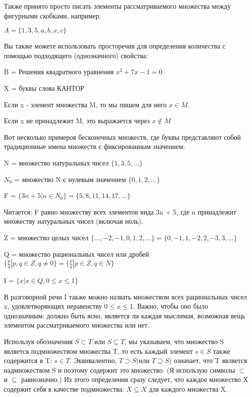 Также принято просто писать элементы рассматриваемого множества между фигурными скобками, например:

\vspace{0.5cm}
\(A = \{1,3,5,a,b,x,c\}\)
\vspace{0.5cm}

Вы также можете использовать просторечия для определения количества с помощью подходящего (однозначного) свойства:

\vspace{0.5cm}
B = Решения квадратного уравнения \(x^2+7x-1=0\)

X = буквы слова КАНТОР
\vspace{0.5cm}

Если x - элемент множества M, то мы пишем для него \(x \in M\).

Если x не принадлежит M, это выражается через \(x \notin M\)
\vspace{0.5cm}

Вот несколько примеров бесконечных множеств, где буквы представляют собой традиционные имена множеств с фиксированным значением:

\vspace{0.5cm}
N = множество натуральных чисел \(\{1,3,5,\dots\}\)

\(N_0\) = множество N с нулевым значением \(\{0,1,2,\dots\}\)

F = \(\{3n + 5|n \in N_0\}=\{5,8,11,14,17,\dots\}\)
\vspace{0.5cm}

Читается: F равно множеству всех элементов вида 3n + 5, где n принадлежит множеству натуральных чисел (включая ноль).

\vspace{0.5cm}
Z = множество целых чисел \(\{\dots,-2,-1,0,1,2,\dots\}=\{0,-1,1,-2,2,-3,3,\dots\}\)

Q = множество рациональных чисел или дробей \(\{\frac{p}{q}|p,q \in Z,q \neq 0\}=\{\frac{p}{q}|p \in Z,q \in N\}\)

I = \(\{x|x \in Q, 0 \le x \le 1\}\)
\vspace{0.5cm}

В разговорной речи I также можно назвать множеством всех рациональных чисел x, удовлетворяющих неравенству \(0 \le x \le 1\).
Важно, чтобы оно было однозначным: должно быть ясно, является ли каждая мыслимая, возможная вещь элементом рассматриваемого множества или нет.

Используя обозначения \(S \subset T\) или \(S \subseteq T\), мы указываем, что множество S является подмножеством множества T, то есть каждый элемент \(s \in S\) также содержится в T: \(s \in T\). Эквивалентно, \(T \supset S\)(или \(T \supseteq S\)) означает, что T является надмножеством S и поэтому содержит это множество. (Я использую символы \(\subset\) и \(\subseteq\) равнозначно.) Из этого определения сразу следует, что каждое множество X содержит себя в качестве подмножества: \(X \subseteq X\) для каждого множества X.

